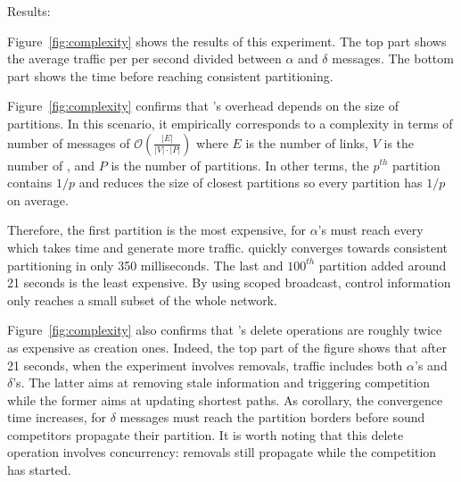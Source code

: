 \begin{asparadesc}
\begin{figure}
\end{figure}

\item [Results:]

Figure~\ref{fig:complexity} shows the results of this experiment. The
top part shows the average traffic per \process per second divided
between $\alpha$ and $\delta$ messages. The bottom part shows the time
before reaching consistent partitioning.

\noindent Figure~\ref{fig:complexity} confirms that \NAME's overhead
depends on the size of partitions. In this scenario, it empirically
corresponds to a complexity in terms of number of messages of
$\mathcal{O}(\frac{|E|}{|V|\cdot|P|})$ where $E$ is the number of
links, $V$ is the number of \processes, and $P$ is the number of
partitions. In other terms, the $p^{th}$ partition contains $1/p$
\processes and reduces the size of closest partitions so every
partition has $1/p$ \processes on average.
  
\noindent Therefore, the first partition is the most expensive, for $\alpha$'s
must reach every \process which takes time and generate more traffic.
\NAME quickly converges towards consistent partitioning in only
350 milliseconds. The last and $100^{th}$ partition added around 21
seconds is the least expensive. By using scoped broadcast, control
information only reaches a small subset of the whole network.

\noindent Figure~\ref{fig:complexity} also confirms that \NAME's
delete operations are roughly twice as expensive as creation
ones. Indeed, the top part of the figure shows that after 21 seconds,
when the experiment involves removals, traffic includes both
$\alpha$'s and $\delta$'s. The latter aims at removing stale
information and triggering competition while the former aims at
updating shortest paths. As corollary, the convergence time increases,
for $\delta$ messages must reach the partition borders before sound
competitors propagate their partition. It is worth noting that this
delete operation involves concurrency: removals still propagate while
the competition has started.


\end{asparadesc}
